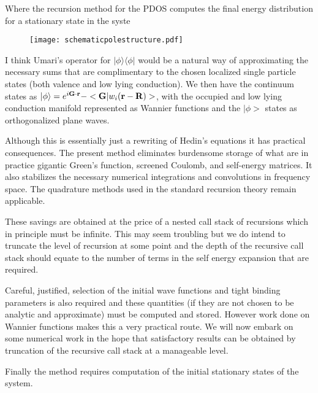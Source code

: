 \documentclass{article}
\def\ket{\rangle}
\def\bra{\langle}
\def\G{{\bf G}}
\def\r{{\bf r}}
\def\R{{\bf R}}
\begin{document}
Where the recursion method for the PDOS computes the final energy distribution
for a stationary state in the syste

\begin{figure}
\texttt{[image: schematicpolestructure.pdf]}
\end{figure}

I think Umari's operator for $|\phi\ket\bra\phi|$ would be a natural way of
approximating the necessary sums that are complimentary to the chosen
localized single particle states (both valence and low lying conduction).
We then have the continuum states as $|\phi\ket=e^{i\G\cdot\r}-<\G|w_{i}(\r-\R)>$,
with the occupied and low lying conduction manifold represented as Wannier 
functions and the $|\phi>$ states as orthogonalized plane waves.

	Although this is essentially just a rewriting of Hedin's equations
it has practical consequences. The present method eliminates
burdensome storage of what are in practice gigantic Green's function, 
screened Coulomb, and self-energy matrices. It also 
stabilizes the necessary numerical integrations and convolutions in frequency space. 
The quadrature methods used in the standard recursion theory remain applicable.

These savings are obtained at the price of a nested call stack of recursions which 
in principle must be infinite. This may seem troubling but we do intend to truncate
the level of recursion at some point and the depth of the recursive call stack should
equate to the number of terms in the self energy expansion that are required.

	Careful, justified, selection of the initial wave functions and tight binding parameters
is also required and these quantities (if they are not chosen to be analytic and approximate)
must be computed and stored. However work done on Wannier functions makes this a very
practical route. We will now embark on some numerical work in the hope that satisfactory 
results can be obtained by truncation of the recursive call stack at a manageable level. 

Finally the method requires computation of the initial stationary states of the system.
\end{document}
